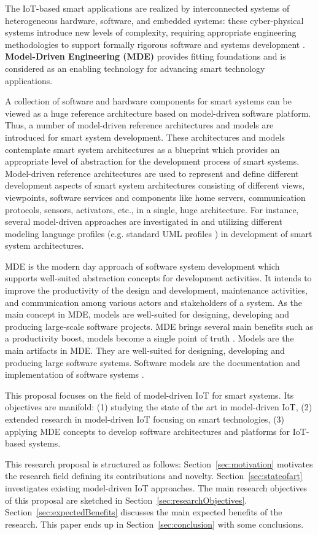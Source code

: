 The IoT-based smart applications are realized by interconnected systems of heterogeneous hardware, software, and embedded systems: these cyber-physical systems introduce new levels of complexity, requiring appropriate engineering methodologies to support formally rigorous software and systems development \cite{Kuryazov+2018}. \textbf{Model-Driven Engineering (MDE)} provides fitting foundations and is considered as an enabling technology for advancing smart technology applications.

A collection of software and hardware components for smart systems can be viewed as a huge reference architecture based on model-driven software platform. Thus, a number of model-driven reference architectures \cite{KateuleWinter2018} and models \cite{Yin+2015} are introduced for smart system development. These architectures and models contemplate smart system architectures as a blueprint which provides an appropriate level of abstraction for the development process of smart systems. Model-driven reference architectures are used to represent and define different development aspects of smart system architectures consisting of different views, viewpoints, software services and components like home servers, communication protocols, sensors, activators, etc., in a single, huge architecture. For instance, several model-driven approaches are investigated in \cite{Corredor+2012} and \cite{KleanthisFoivos2016} utilizing different modeling language profiles (e.g. standard UML profiles \cite{Rumbaugh+2004}) in development of smart system architectures.

MDE is the modern day approach of software system development which supports well-suited abstraction concepts for development activities. It intends to improve the productivity of the design and development, maintenance activities, and communication among various actors and stakeholders of a system. As the main concept in MDE, models are well-suited for designing, developing and producing large-scale software projects. MDE brings several main benefits such as a productivity boost, models become a single point of truth \cite{Fleurey+2011}. Models are the main artifacts in MDE. They are well-suited for designing, developing and producing large software systems. Software models are the documentation and implementation of software systems \cite{Kleppe+2003}.

This proposal focuses on the field of model-driven IoT for smart systems. Its objectives are manifold: (1) studying the state of the art in model-driven IoT, (2) extended research in model-driven IoT focusing on smart technologies, (3) applying MDE concepts to develop software architectures and platforms for IoT-based systems.

This research proposal is structured as follows: Section~\ref{sec:motivation} motivates the research field defining its contributions and novelty. Section~\ref{sec:stateofart} investigates existing model-driven IoT approaches. The main research objectives of this proposal are sketched in Section~\ref{sec:researchObjectives}. Section~\ref{sec:expectedBenefits} discusses the main expected benefits of the research. This paper ends up in Section~\ref{sec:conclusion} with some conclusions.